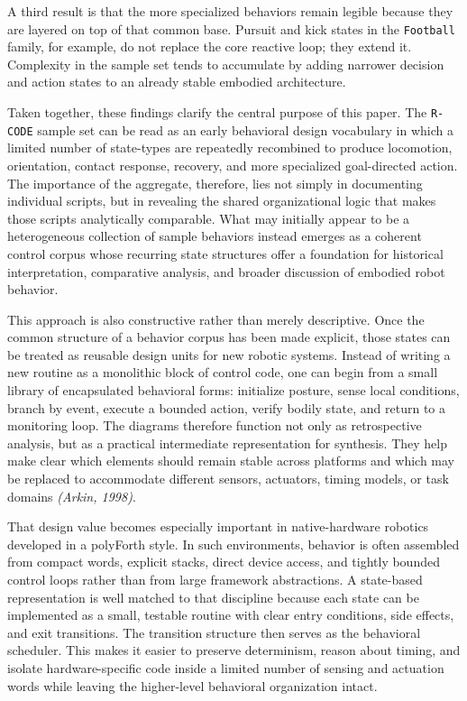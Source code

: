 \documentclass[11pt]{article}
\begin{document}
A third result is that the more specialized behaviors remain legible
because they are layered on top of that common base. Pursuit and kick
states in the \texttt{Football} family, for example, do not replace the
core reactive loop; they extend it. Complexity in the sample set tends
to accumulate by adding narrower decision and action states to an
already stable embodied architecture.

Taken together, these findings clarify the central purpose of this
paper. The \texttt{R-CODE} sample set can be read as an early
behavioral design vocabulary in which a limited number of state-types
are repeatedly recombined to produce locomotion, orientation, contact
response, recovery, and more specialized goal-directed action. The
importance of the aggregate, therefore, lies not simply in documenting
individual scripts, but in revealing the shared organizational logic
that makes those scripts analytically comparable. What may initially
appear to be a heterogeneous collection of sample behaviors instead
emerges as a coherent control corpus whose recurring state structures
offer a foundation for historical interpretation, comparative
analysis, and broader discussion of embodied robot behavior.

This approach is also constructive rather than merely descriptive.
Once the common structure of a behavior corpus has been made explicit,
those states can be treated as reusable design units for new robotic
systems. Instead of writing a new routine as a monolithic block of
control code, one can begin from a small library of encapsulated
behavioral forms: initialize posture, sense local conditions, branch by
event, execute a bounded action, verify bodily state, and return to a
monitoring loop. The diagrams therefore function not only as
retrospective analysis, but as a practical intermediate representation
for synthesis. They help make clear which elements should remain stable
across platforms and which may be replaced to accommodate different
sensors, actuators, timing models, or task domains \textit{(Arkin, 1998)}.

That design value becomes especially important in native-hardware
robotics developed in a polyForth style. In such environments,
behavior is often assembled from compact words, explicit stacks, direct
device access, and tightly bounded control loops rather than from large
framework abstractions. A state-based representation is well matched to
that discipline because each state can be implemented as a small,
testable routine with clear entry conditions, side effects, and exit
transitions. The transition structure then serves as the behavioral
scheduler. This makes it easier to preserve determinism, reason about
timing, and isolate hardware-specific code inside a limited number of
sensing and actuation words while leaving the higher-level behavioral
organization intact.
\end{document}
